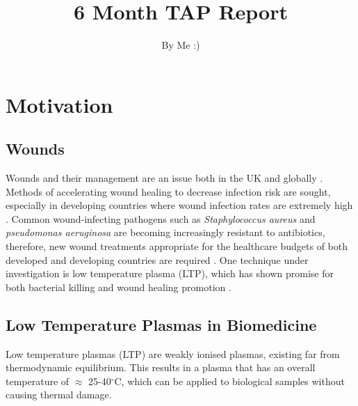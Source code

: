 \documentclass[11pt, oneside]{article}   	%
\title{6 Month TAP Report}
\author{By Me :)}
\date{}							%
\begin{document}
\maketitle

\section{Motivation}
\subsection{Wounds}

Wounds and their management are an issue both in the UK and globally \cite{Posnett2008the}.
Methods of accelerating wound healing to decrease infection risk are sought, especially in developing countries where wound infection rates are extremely high \cite{Kihla2014risk}. 
Common wound-infecting pathogens such as \textit{Staphylococcus aureus} and \textit{pseudomonas aeruginosa} \cite{Church2006burn, Bowler2001wound} are becoming increasingly resistant to antibiotics, therefore, new wound treatments appropriate for the healthcare budgets of both developed and developing countries are required \cite{Chambers2009waves, Godebo2013multidrug, Howell2005a}.
One technique under investigation is low temperature plasma (LTP), which has shown promise for both bacterial killing and wound healing promotion \cite{Kong2009plasma, Kramer2013suitability, Isbary2012successful, Isbary2010a}.

\subsection{Low Temperature Plasmas in Biomedicine}
Low temperature plasmas (LTP) are weakly ionised plasmas, existing far from thermodynamic equilibrium.
This results in a plasma that has an overall temperature of $\approx$ 25-40$^\circ$C, which can be applied to biological samples without causing thermal damage.
\end{document}
